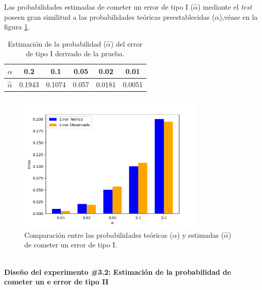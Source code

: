 \documentclass[12pt]{report}
\begin{document}
Las probabilidades estimadas de cometer un error de tipo I ($\hat{\alpha}$) mediante el \textit{test} poseen gran similitud  a las probabilidades teóricas preestablecidas ($\alpha$),véase en la figura \ref{Teorico vs Observado3}.
\begin{table}[h!]
	\centering
	\begin{tabular}{|c|ccccc|}
		\hline
		$\alpha$ & 0.2 &   0.1 &  0.05 &  0.02 &  0.01 \\
		\hline
		$\hat{\alpha}$ & 0.1943 & 0.1074 & 0.057 & 0.0181 & 0.0051 \\
		\hline
	\end{tabular}
	\caption{Estimación de la probabilidad ($\hat{\alpha}$) del error de tipo I derivado de la prueba.}
	\label{tab3:error1-prob1}
\end{table}
\begin{figure}[ht]
	\centering
	
	\includegraphics[width=0.8\textwidth]{5td_teo_obs.png}
	\caption{Comparación entre las probabilidades teóricas ($\alpha$) y estimadas ($\hat{\alpha}$) de cometer un error de tipo I. }
	\label{Teorico vs Observado3}
\end{figure}\\
\newpage
\textbf{Diseño del experimento \#3.2: Estimación de la probabilidad de cometer un e error de tipo II}
\end{document}
